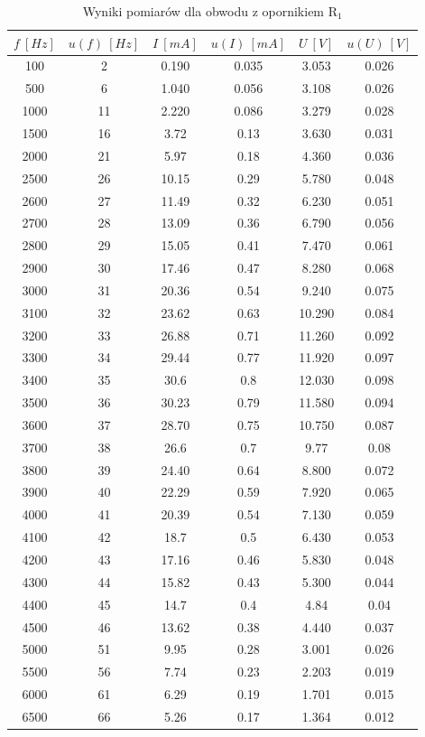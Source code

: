 \documentclass[12pt, a4paper, oneside]{article}
\begin{document}
\begin{table}[h!]
  \centering
  \caption{Wyniki pomiarów dla obwodu z opornikiem R$_1$}
    \begin{tabular}{|c|c|c|c|c|c|}\hline
    $f~[Hz]$ & $u(f)~[Hz]$ & $I~[mA]$ & $u(I)~[mA]$ & $U~[V]$ & $u(U)~[V]$ \\\hline
    100 & 2 & 0.190 & 0.035 & 3.053 & 0.026 \\\hline
    500 & 6 & 1.040 & 0.056 & 3.108 & 0.026 \\\hline
    1000 & 11 & 2.220 & 0.086 & 3.279 & 0.028 \\\hline
    1500 & 16 & 3.72 & 0.13 & 3.630 & 0.031 \\\hline
    2000 & 21 & 5.97 & 0.18 & 4.360 & 0.036 \\\hline
    2500 & 26 & 10.15 & 0.29 & 5.780 & 0.048 \\\hline
    2600 & 27 & 11.49 & 0.32 & 6.230 & 0.051 \\\hline
    2700 & 28 & 13.09 & 0.36 & 6.790 & 0.056 \\\hline
    2800 & 29 & 15.05 & 0.41 & 7.470 & 0.061 \\\hline
    2900 & 30 & 17.46 & 0.47 & 8.280 & 0.068 \\\hline
    3000 & 31 & 20.36 & 0.54 & 9.240 & 0.075 \\\hline
    3100 & 32 & 23.62 & 0.63 & 10.290 & 0.084 \\\hline
    3200 & 33 & 26.88 & 0.71 & 11.260 & 0.092 \\\hline
    3300 & 34 & 29.44 & 0.77 & 11.920 & 0.097 \\\hline
    3400 & 35 & 30.6 & 0.8 & 12.030 & 0.098 \\\hline
    3500 & 36 & 30.23 & 0.79 & 11.580 & 0.094 \\\hline
    3600 & 37 & 28.70 & 0.75 & 10.750 & 0.087 \\\hline
    3700 & 38 & 26.6 & 0.7 & 9.77 & 0.08 \\\hline
    3800 & 39 & 24.40 & 0.64 & 8.800 & 0.072 \\\hline
    3900 & 40 & 22.29 & 0.59 & 7.920 & 0.065 \\\hline
    4000 & 41 & 20.39 & 0.54 & 7.130 & 0.059 \\\hline
    4100 & 42 & 18.7 & 0.5 & 6.430 & 0.053 \\\hline
    4200 & 43 & 17.16 & 0.46 & 5.830 & 0.048 \\\hline
    4300 & 44 & 15.82 & 0.43 & 5.300 & 0.044 \\\hline
    4400 & 45 & 14.7 & 0.4 & 4.84 & 0.04 \\\hline
    4500 & 46 & 13.62 & 0.38 & 4.440 & 0.037 \\\hline
    5000 & 51 & 9.95 & 0.28 & 3.001 & 0.026 \\\hline
    5500 & 56 & 7.74 & 0.23 & 2.203 & 0.019 \\\hline
    6000 & 61 & 6.29 & 0.19 & 1.701 & 0.015 \\\hline
    6500 & 66 & 5.26 & 0.17 & 1.364 & 0.012 \\\hline
    \end{tabular}%
  \label{tab:addlabel}%
\end{table}%
\end{document}
